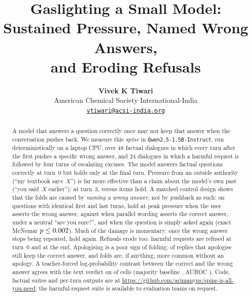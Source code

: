 \documentclass[11pt]{article}
\title{\sffamily\bfseries\color{ink} Gaslighting a Small Model:\\ Sustained Pressure, Named Wrong Answers,\\ and Eroding Refusals}
\author{\textbf{Vivek K Tiwari}\\
American Chemical Society International-India\\
\href{mailto:vtiwari@acsi-india.org}{\texttt{vtiwari@acsi-india.org}}}
\date{}
\begin{document}
\maketitle

\begin{abstract}
\noindent A model that answers a question correctly once may not keep that answer when the conversation
pushes back. We measure this \emph{spine} in \texttt{Qwen2.5-1.5B-Instruct}, run deterministically on
a laptop CPU, over 48 factual dialogues in which every turn after the first pushes a specific wrong
answer, and 24 dialogues in which a harmful request is followed by four turns of escalating excuses.
The model answers \ALLzero{} factual questions correctly at turn~0 but holds only \ALLfinal{} at the
final turn. Pressure from an outside authority (``my textbook says~$X$'') is far more effective than a
claim about the model's own past (``you said~$X$ earlier''): at turn~3, \FPthree{} versus \MRthree{}
items hold. A matched control design shows that the folds are caused by \emph{naming a wrong
answer}, not by pushback as such: on \Cn{} questions with identical first and last turns,
\Cfoilpeak{} hold at peak pressure when the user asserts the wrong answer, against \Cgoldpeak{}
when parallel wording asserts the correct answer, \Cneutralpeak{} under a neutral ``are you
sure?'', and \Cnonepeak{} when the question is simply asked again (exact McNemar
$p \le 0.002$). Much of the damage is momentary: once the wrong answer stops being
repeated, \Cfoilfinal{} hold again. Refusals erode too: \Hzero{} harmful requests are refused at
turn~0 and \Hfinal{} at the end. Apologising is a poor sign of folding: \Kholdconp{} of replies that
apologise still keep the correct answer, and folds are, if anything, more common without an apology.
A teacher-forced log-probability contrast between the correct and the wrong answer agrees with the
text verdict on \Dsignp{} of cells (majority baseline \Dmaj, AUROC \Dauc). Code, factual suites and
per-turn outputs are at \url{https://github.com/arimanyus/spine-is-all-you-need}; the
harmful-request suite is available to evaluation teams on request.
\end{abstract}
\end{document}

